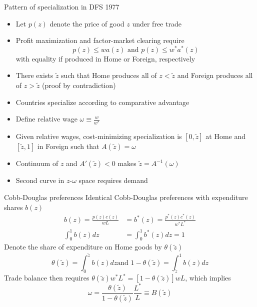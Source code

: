 \documentclass[11pt,notes=hide,aspectratio=169]{beamer}
\begin{document}
\begin{frame}{Pattern of specialization in DFS 1977}
\begin{itemize}
	\item Let $p(z)$ denote the price of good $z$ under free trade
	\item Profit maximization and factor-market clearing require
		\vspace{-2mm}
		\begin{equation*}p(z) \leq w a(z)   \text{ and } p(z) \leq w^{*} a^{*}(z) \end{equation*}
		with equality if produced in Home or Foreign, respectively
	\item There exists $\tilde{z}$ such that Home produces all of $z<\tilde{z}$ and Foreign produces all of $z>\tilde{z}$ (proof by contradiction)
	\item Countries specialize according to comparative advantage
	\item Define relative wage $\omega \equiv \frac{w}{w^*}$
	\item Given relative wages, cost-minimizing specialization is $[0,\tilde{z}]$ at Home and $[\tilde{z},1]$ in Foreign such that $A(\tilde{z}) = \omega$
	\item Continuum of $z$ and $A'(\tilde{z})<0$ makes $\tilde{z} = A^{-1}(\omega)$
	\item Second curve in $z$-$\omega$ space requires demand
\end{itemize}
\end{frame}
\begin{frame}{Cobb-Douglas preferences}
Identical Cobb-Douglas preferences with expenditure shares $b(z)$
\begin{align*}
b\left(z\right) 	 =\frac{p\left(z\right) c\left(z\right) }{wL}
&=b^{*}\left(z\right) =\frac{p^{\ast}\left(z\right) c^{\ast}\left(z\right)}{w^{\ast}L^{\ast}}
\\
\int_{0}^{1}b\left(z\right) dz 
& = \int_{0}^{1}b^{\ast}\left(z\right) dz
=1
\end{align*}
Denote the share of expenditure on Home goods by $\theta\left(\tilde{z}\right)$
\begin{equation*}
\theta \left( \tilde{z}\right) =\int_{0}^{\tilde{z}}b\left( z\right) dz\text{
\ \ \ and \ \ \ }1-\theta \left( \tilde{z}\right) =\int_{\tilde{z}%
}^{1}b\left( z\right) dz
\end{equation*}
Trade balance then requires 
$\theta \left(\tilde{z}\right) w^{*}L^{*}
=\left[1-\theta \left(\tilde{z}\right) \right] wL$,
which implies
\begin{equation*}
\omega =\frac{\theta \left(\tilde{z}\right) }{1-\theta \left(\tilde{z}%
\right) }\frac{L^{*}}{L}\equiv B\left(\tilde{z}\right)
\end{equation*}
\end{frame}
\end{document}
